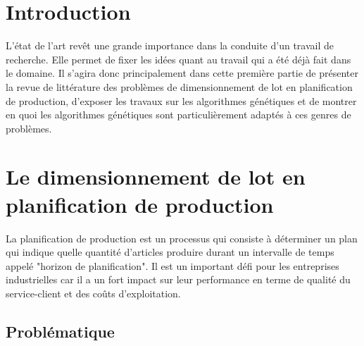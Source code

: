 \documentclass[12pt,a4paper]{article}
\begin{document}
		\section*{Introduction}
		L'état de l'art revêt une grande importance dans la conduite d'un travail de recherche. Elle permet de fixer les idées quant au travail qui a été déjà fait dans le domaine. Il s'agira donc principalement dans cette première partie de présenter la revue de littérature des problèmes de dimensionnement de lot en planification de production, d'exposer les travaux sur les algorithmes génétiques et de montrer en quoi les algorithmes génétiques sont particulièrement adaptés à ces genres de problèmes.
		
	\section{Le dimensionnement de lot en planification de production}
	La planification de production est un processus qui consiste à déterminer un plan qui indique quelle quantité d'articles produire durant un intervalle de temps appelé "horizon de planification". Il est un important défi pour les entreprises industrielles car il a un fort impact sur leur performance en terme de qualité du service-client et des coûts d'exploitation.	
	
	\subsection{Problématique}
		
\end{document}
